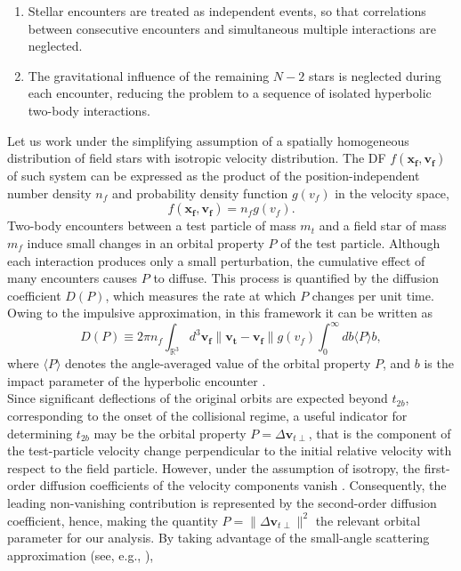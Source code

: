 \documentclass[12pt,twoside,openany]{book}
\begin{document}
\begin{enumerate}
\item Stellar encounters are treated as independent events, so that correlations between consecutive encounters and simultaneous multiple interactions are neglected.
\item The gravitational influence of the remaining $N-2$ stars is neglected during each encounter, reducing the problem to a sequence of isolated hyperbolic two-body interactions.
\end{enumerate}
Let us work under the simplifying assumption of a spatially homogeneous distribution of field stars with isotropic velocity distribution. The DF $f(\mathbf{x_f},\mathbf{v_f})$ of such system can be expressed as the product of the position-independent number density $n_f$ and probability density function $g(v_f)$ in the velocity space,
\begin{equation}
    f(\mathbf{x_f},\mathbf{v_f})=n_fg(v_f).
\end{equation}
Two-body encounters between a test particle of mass $m_t$ and a field star of mass $m_f$ induce small changes in an orbital property $P$ of the test particle. Although each interaction produces only a small perturbation, the cumulative effect of many encounters causes $P$ to diffuse. This process is quantified by the diffusion coefficient $D(P)$, which measures the rate at which $P$ changes per unit time. Owing to the impulsive approximation, in this framework it can be written as
\begin{equation}\label{diffusion coeff def}
    D(P)\equiv 2\pi n_f\int_{\mathbb{R}^3} d^3\mathbf{v_f}\|\mathbf{v_t}-\mathbf{v_f}\|g(v_f)\int_0^\infty db\langle P\rangle b,
 \end{equation}
where $\langle P\rangle$ denotes the angle-averaged value of the orbital property $P$, and $b$ is the impact parameter of the hyperbolic encounter \parencite{Ciotti_book}.\\Since significant deflections of the original orbits are expected beyond $t_{2b}$, corresponding to the onset of the collisional regime, a useful indicator for determining $t_{2b}$ may be the orbital property $P=\Delta\mathbf{v}_{t\perp}$, that is the component of the test-particle velocity change perpendicular to the initial relative velocity with respect to the field particle. However, under the assumption of isotropy, the first-order diffusion coefficients of the velocity components vanish \parencite{Binney_book}. Consequently, the leading non-vanishing contribution is represented by the second-order diffusion coefficient, hence, making the quantity $P=\|\Delta \mathbf{v}_{t\perp}\|^2$ the relevant orbital parameter for our analysis. By taking advantage of the small-angle scattering approximation (see, e.g., \citealt{Chandrasekhar_1943}),
\end{document}
